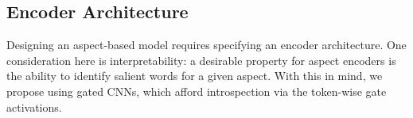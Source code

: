 \documentclass[11pt,a4paper]{article}
\begin{document}








\vspace{-.25em}
\subsection{Encoder Architecture}
\label{section:encoder}
\vspace{-.25em}

Designing an aspect-based model requires specifying an encoder architecture. One consideration here is interpretability: a desirable property for aspect encoders is the ability to identify salient words for a given aspect. With this in mind, we propose using gated CNNs, which afford introspection via the token-wise gate activations. 
\end{document}
